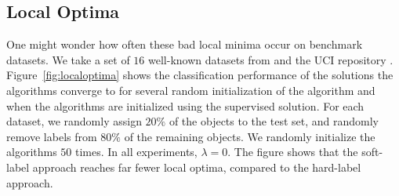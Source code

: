 \documentclass[conference,a4paper,10pt]{IEEEtran}\usepackage[]{graphicx}\usepackage[]{color}
\begin{document}
\subsection{Local Optima}
One might wonder how often these bad local minima occur on benchmark datasets. We take a set of $16$ well-known datasets from \cite{Chapelle2006} and the UCI repository \cite{Lichman2013}. Figure~\ref{fig:localoptima} shows the classification performance of the solutions the algorithms converge to for several random initialization of the algorithm and when the algorithms are initialized using the supervised solution. For each dataset, we randomly assign $20\%$ of the objects to the test set, and randomly remove labels from $80\%$ of the remaining objects. We randomly initialize the algorithms $50$ times. In all experiments, $\lambda=0$. The figure shows that the soft-label approach reaches far fewer local optima, compared to the hard-label approach.
\end{document}
